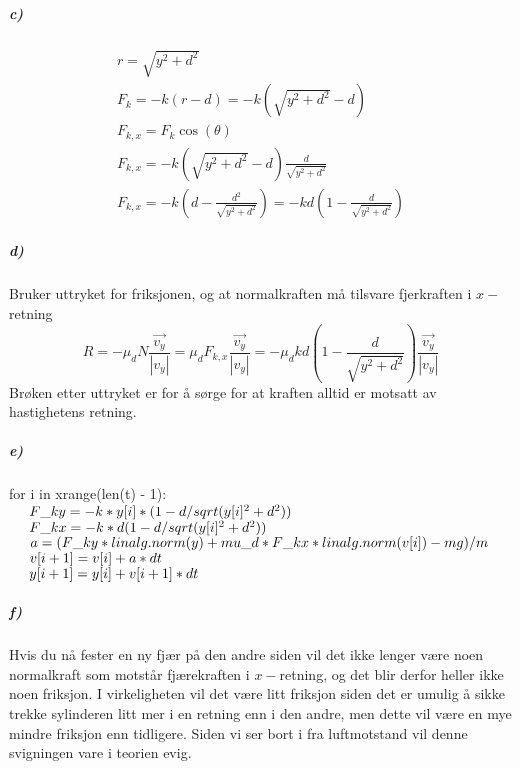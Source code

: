 \documentclass[11pt, A4paper,norsk]{article}
\begin{document}
			\subparagraph{c)}
				\begin{gather*}
r = \sqrt{y^2 + d^2} \\
F_{k} = - k (r - d) = - k (\sqrt{y^2 + d^2} - d) \\
F_{k,x} = F_k \cos(\theta) \\
F_{k,x} = - k (\sqrt{y^2 + d^2} - d) \frac{d}{\sqrt{y^2 + d^2}} \\
F_{k,x} = - k \left( d - \frac{d^2}{\sqrt{y^2 + d^2}} \right) = - kd \left( 1 - \frac{d}{\sqrt{y^2 + d^2}} \right)
				\end{gather*}









			\subparagraph{d)}
				\begin{flushleft}
Bruker uttryket for friksjonen, og at normalkraften må tilsvare fjerkraften i $x-$retning
$$R = - \mu_d N \frac{\vec{v_y}}{|v_y|} = \mu_d F_{k,x} \frac{\vec{v_y}}{|v_y|} = - \mu_d kd \left( 1 - \frac{d}{\sqrt{y^2 + d^2}} \right) \frac{\vec{v_y}}{|v_y|}$$
Brøken etter uttryket er for å sørge for at kraften alltid er motsatt av hastighetens retning.
				\end{flushleft}









			\subparagraph{e)}
				\begin{flushleft}
for i in xrange(len(t) - 1): \\
$\hspace{5mm} F\_ky = - k * y[i] * ( 1 - d / sqrt(y[i]^2 + d^2))$ \\
$\hspace{5mm} F\_kx = - k * d ( 1 - d / sqrt(y[i]^2 + d^2))$ \\
$\hspace{5mm} a = (F\_ky * linalg.norm(y) + mu\_d * F\_kx * linalg.norm(v[i]) - mg) / m$ \\
$\hspace{5mm} v[i + 1] = v[i] + a * dt$ \\
$\hspace{5mm} y[i + 1] = y[i] + v[i + 1] * dt$ \\
				\end{flushleft}









			\subparagraph{f)}
				\begin{flushleft}
Hvis du nå fester en ny fjær på den andre siden vil det ikke lenger være noen normalkraft som motstår fjærekraften i $x-$retning, og det blir derfor heller ikke noen friksjon. I virkeligheten vil det være litt friksjon siden det er umulig å sikke trekke sylinderen litt mer i en retning enn i den andre, men dette vil være en mye mindre friksjon enn tidligere. Siden vi ser bort i fra luftmotstand vil denne svigningen vare i teorien evig.
				\end{flushleft}
\end{document}
